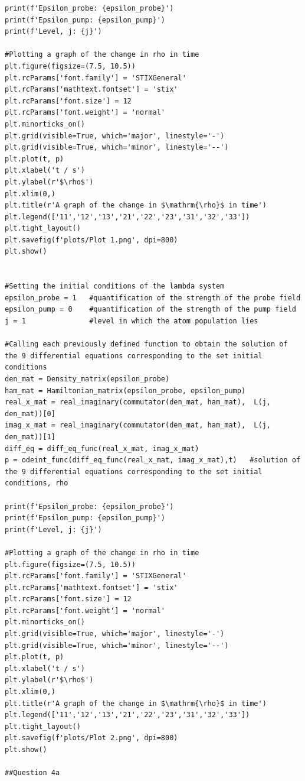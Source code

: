 \documentclass[12pt, a4paper]{article}
\begin{document}
\begin{lstlisting}[language=iPython]
print(f'Epsilon_probe: {epsilon_probe}')
print(f'Epsilon_pump: {epsilon_pump}')
print(f'Level, j: {j}')

#Plotting a graph of the change in rho in time
plt.figure(figsize=(7.5, 10.5))
plt.rcParams['font.family'] = 'STIXGeneral'
plt.rcParams['mathtext.fontset'] = 'stix'
plt.rcParams['font.size'] = 12
plt.rcParams['font.weight'] = 'normal'
plt.minorticks_on()
plt.grid(visible=True, which='major', linestyle='-')
plt.grid(visible=True, which='minor', linestyle='--')
plt.plot(t, p)
plt.xlabel('t / s')
plt.ylabel(r'$\rho$')
plt.xlim(0,)
plt.title(r'A graph of the change in $\mathrm{\rho}$ in time')
plt.legend(['11','12','13','21','22','23','31','32','33'])
plt.tight_layout()
plt.savefig(f'plots/Plot 1.png', dpi=800)
plt.show()


#Setting the initial conditions of the lambda system
epsilon_probe = 1   #quantification of the strength of the probe field
epsilon_pump = 0    #quantification of the strength of the pump field
j = 1               #level in which the atom population lies

#Calling each previously defined function to obtain the solution of the 9 differential equations corresponding to the set initial conditions
den_mat = Density_matrix(epsilon_probe)
ham_mat = Hamiltonian_matrix(epsilon_probe, epsilon_pump)
real_x_mat = real_imaginary(commutator(den_mat, ham_mat),  L(j, den_mat))[0]
imag_x_mat = real_imaginary(commutator(den_mat, ham_mat),  L(j, den_mat))[1]
diff_eq = diff_eq_func(real_x_mat, imag_x_mat)
p = odeint_func(diff_eq_func(real_x_mat, imag_x_mat),t)   #solution of the 9 differential equations corresponding to the set initial conditions, rho

print(f'Epsilon_probe: {epsilon_probe}')
print(f'Epsilon_pump: {epsilon_pump}')
print(f'Level, j: {j}')

#Plotting a graph of the change in rho in time
plt.figure(figsize=(7.5, 10.5))
plt.rcParams['font.family'] = 'STIXGeneral'
plt.rcParams['mathtext.fontset'] = 'stix'
plt.rcParams['font.size'] = 12
plt.rcParams['font.weight'] = 'normal'
plt.minorticks_on()
plt.grid(visible=True, which='major', linestyle='-')
plt.grid(visible=True, which='minor', linestyle='--')
plt.plot(t, p)
plt.xlabel('t / s')
plt.ylabel(r'$\rho$')
plt.xlim(0,)
plt.title(r'A graph of the change in $\mathrm{\rho}$ in time')
plt.legend(['11','12','13','21','22','23','31','32','33'])
plt.tight_layout()
plt.savefig(f'plots/Plot 2.png', dpi=800)
plt.show()

##Question 4a


\end{lstlisting}
\end{document}
